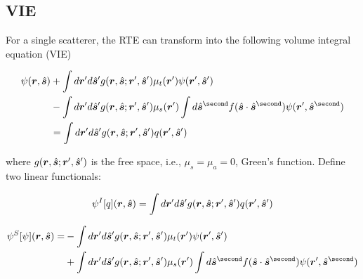 \documentclass [10pt,letterpaper]{article}
\newcommand{\unitvectorsym}[1]{\hat{\vectorsym{#1}}}
\begin{document}
\subsection{VIE}
\label{subsec:vie}

For a single scatterer, the RTE can transform into the following volume integral equation (VIE)

\begin{equation}\label{eq:def-VIE}\begin{split}
\psi(\vectorsym{r},\unitvectorsym{s})
&+
\int d\vectorsym{r}^\prime d\unitvectorsym{s}^\prime g(\vectorsym{r},\unitvectorsym{s};\vectorsym{r}^\prime,\unitvectorsym{s}^\prime)
\mu_t(\vectorsym{r}^\prime)\psi(\vectorsym{r}^\prime,\unitvectorsym{s}^\prime)
\\ &-
\int d\vectorsym{r}^\prime d\unitvectorsym{s}^\prime g(\vectorsym{r},\unitvectorsym{s};\vectorsym{r}^\prime,\unitvectorsym{s}^\prime)
\mu_s(\vectorsym{r}^\prime)\int d\unitvectorsym{s}^{\second}
f(\unitvectorsym{s}\cdot\unitvectorsym{s}^{\second})\psi(\vectorsym{r}^\prime,\unitvectorsym{s}^{\second})
\\ &=
\int d\vectorsym{r}^\prime d\unitvectorsym{s}^\prime g(\vectorsym{r},\unitvectorsym{s};\vectorsym{r}^\prime,\unitvectorsym{s}^\prime)
q(\vectorsym{r}^\prime,\unitvectorsym{s}^\prime)
\end{split}\end{equation}

where $g(\vectorsym{r},\unitvectorsym{s};\vectorsym{r}^\prime,\unitvectorsym{s}^\prime)$ is the free space, i.e., $\mu_s=\mu_a=0$, Green's function.
Define two linear functionals:

\begin{equation} \label{eq:def-psiI-general}
    \psi^I[q](\vectorsym{r},\unitvectorsym{s})=
    \int d\vectorsym{r}^\prime d\unitvectorsym{s}^\prime
    g(\vectorsym{r},\unitvectorsym{s};\vectorsym{r}^\prime,\unitvectorsym{s}^\prime)
    q(\vectorsym{r}^\prime,\unitvectorsym{s}^\prime)
\end{equation}

\begin{equation} \label{eq:def-psiS-general}
	\begin{split}
	    \psi^S[\psi](\vectorsym{r},\unitvectorsym{s})=
	    &-\int d\vectorsym{r}^\prime d\unitvectorsym{s}^\prime 
	    g(\vectorsym{r},\unitvectorsym{s};\vectorsym{r}^\prime,\unitvectorsym{s}^\prime)
	    \mu_t(\vectorsym{r}^\prime)
	    \psi(\vectorsym{r}^\prime,\unitvectorsym{s}^\prime) \\
	    &+\int d\vectorsym{r}^\prime d\unitvectorsym{s}^\prime 
	    g(\vectorsym{r},\unitvectorsym{s};\vectorsym{r}^\prime,\unitvectorsym{s}^\prime)
	    \mu_s(\vectorsym{r}^\prime)\int d\unitvectorsym{s}^{\second}
	    f(\unitvectorsym{s}\cdot\unitvectorsym{s}^{\second})
	    \psi(\vectorsym{r}^\prime,\unitvectorsym{s}^{\second})
	\end{split}
\end{equation}
\end{document}
